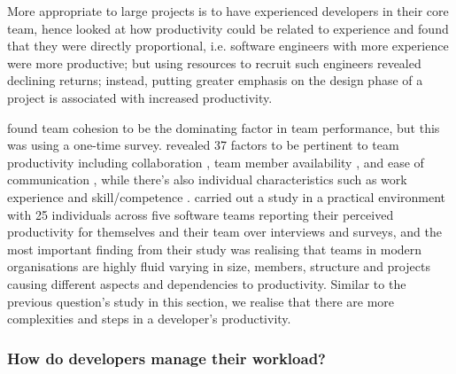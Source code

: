 \documentclass[../mpaper.tex]{subfiles}
\begin{document}
More appropriate to large projects is to have experienced developers in their core team, hence \citet{gillProductivityImpactsSoftware1990} looked at how productivity could be related to experience and found that they were directly proportional, i.e. software engineers with more experience were more productive; but using resources to recruit such engineers revealed declining returns; instead, putting greater emphasis on the design phase of a project is associated with increased productivity.

\citet{lakhanpalUnderstandingFactorsInfluencing1993} found team cohesion to be the dominating factor in team performance, but this was using a one-time survey. \citet{canedoFactorsAffectingSoftware2019} revealed 37 factors to be pertinent to team productivity including collaboration \cite{clincySoftwareDevelopmentProductivity2003,stephanidisHCIInternational20152015}, team member availability \cite{deomeloInterpretativeCaseStudies2013,maxwellBenchmarkingSoftwareDevelopmentProductivity2000}, and ease of communication \cite{wagnerSystematicReviewProductivity2018,yilmazEffectiveSocialProductivity2016}, while there's also individual characteristics such as work experience \cite{deomeloInterpretativeCaseStudies2013} and skill/competence \cite{maxwellBenchmarkingSoftwareDevelopmentProductivity2000,oliveiraSoftwareProjectManagers2016}. \citet{ruvimovaExploratoryStudyProductivity2022} carried out a study in a practical environment with 25 individuals across five software teams reporting their perceived productivity for themselves and their team over interviews and surveys, and the most important finding from their study was realising that teams in modern organisations are highly fluid varying in size, members, structure and projects causing different aspects and dependencies to productivity. Similar to the previous question's study in this section, we realise that there are more complexities and steps in a developer's productivity.

\subsubsection*{How do developers manage their workload?}
\end{document}
